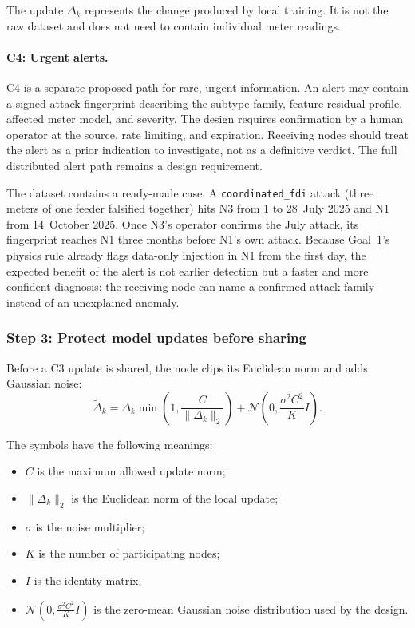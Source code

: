 \documentclass[11pt,a4paper]{article}
\newcommand{\code}[1]{\texttt{#1}}
\begin{document}
The update $\Delta_k$ represents the change produced by local training.
It is not the raw dataset and does not need to contain individual
meter readings.

\paragraph{C4: Urgent alerts.}

C4 is a separate proposed path for rare, urgent information. An alert
may contain a signed attack fingerprint describing the subtype family,
feature-residual profile, affected meter model, and severity. The
design requires confirmation by a human operator at the source,
rate limiting, and expiration. Receiving nodes should treat the alert
as a prior indication to investigate, not as a definitive verdict.
The full distributed alert path remains a design requirement.

The dataset contains a ready-made case. A \code{coordinated\_fdi}
attack (three meters of one feeder falsified together) hits N3 from
1 to 28~July 2025 and N1 from 14~October 2025. Once N3's operator
confirms the July attack, its fingerprint reaches N1 three months
before N1's own attack. Because Goal~1's physics rule already flags
data-only injection in N1 from the first day, the expected benefit of
the alert is not earlier detection but a faster and more confident
diagnosis: the receiving node can name a confirmed attack family
instead of an unexplained anomaly.

\subsubsection{Step 3: Protect model updates before sharing}

Before a C3 update is shared, the node clips its Euclidean norm and
adds Gaussian noise:
\begin{equation}
\widetilde{\Delta}_k
=
\Delta_k
\min\!\left(1,\frac{C}{\|\Delta_k\|_2}\right)
+
\mathcal N\!\left(
0,\frac{\sigma^2 C^2}{K}I
\right).
\label{eq:protocol-protected-update}
\end{equation}

The symbols have the following meanings:
\begin{itemize}
    \item $C$ is the maximum allowed update norm;
    \item $\|\Delta_k\|_2$ is the Euclidean norm of the local update;
    \item $\sigma$ is the noise multiplier;
    \item $K$ is the number of participating nodes;
    \item $I$ is the identity matrix;
    \item $\mathcal N(0,\frac{\sigma^2 C^2}{K}I)$ is the
    zero-mean Gaussian noise distribution used by the design.
\end{itemize}
\end{document}
